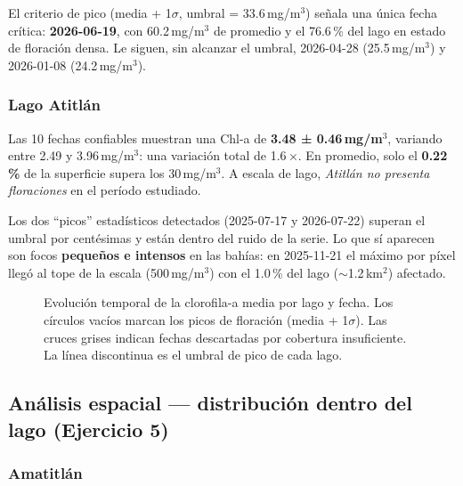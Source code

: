 \documentclass[12pt, a4paper]{article}
\newcommand{\mgm}{\,mg/m$^3$}
\newcommand{\kmsq}{\,km$^2$}
\begin{document}
El criterio de pico (media + 1$\sigma$, umbral = 33.6\mgm) señala una única fecha
crítica: \textbf{2026-06-19}, con 60.2\mgm{} de promedio y el 76.6\,\% del lago en
estado de floración densa. Le siguen, sin alcanzar el umbral, 2026-04-28 (25.5\mgm) y
2026-01-08 (24.2\mgm).

\subsubsection{Lago Atitlán}

Las 10 fechas confiables muestran una Chl-a de \textbf{3.48 ± 0.46\mgm{}}, variando
entre 2.49 y 3.96\mgm{}: una variación total de 1.6\,×. En promedio, solo el
\textbf{0.22\,\%} de la superficie supera los 30\mgm. A escala de lago,
\emph{Atitlán no presenta floraciones} en el período estudiado.

Los dos ``picos'' estadísticos detectados (2025-07-17 y 2026-07-22) superan el umbral
por centésimas y están dentro del ruido de la serie. Lo que sí aparecen son focos
\textbf{pequeños e intensos} en las bahías: en 2025-11-21 el máximo por píxel llegó
al tope de la escala (500\mgm) con el 1.0\,\% del lago ($\sim$1.2\kmsq) afectado.

\begin{figure}[H]
  \centering
  \caption{Evolución temporal de la clorofila-a media por lago y fecha. Los círculos vacíos marcan los picos de floración (media + 1$\sigma$). Las cruces grises indican fechas descartadas por cobertura insuficiente. La línea discontinua es el umbral de pico de cada lago.}
  \label{fig:serie_temporal}
\end{figure}

\subsection{Análisis espacial — distribución dentro del lago (Ejercicio 5)}

\subsubsection{Amatitlán}
\end{document}
